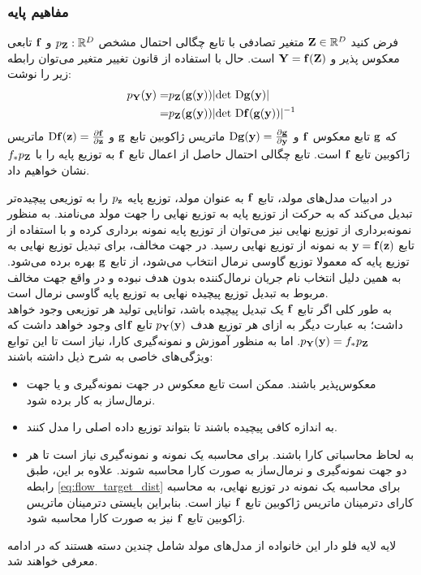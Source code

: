 \subsubsection{مفاهیم پایه}
فرض کنید
${\bf{ Z}} \in \mathbb{R}^{D}$
متغیر تصادفی با تابع چگالی احتمال مشخص
$p_{\bf Z}: \mathbb{R}^D$
و $\bf f$ تابعی معکوس پذیر و
${\bf Y} = {\bf f}({\bf Z})$
است. حال با استفاده از قانون تغییر متغیر می‌توان رابطه زیر را نوشت:
\begin{align}  \label{eq:flow_target_dist}
	p_{\bf Y}({\bf y}) = & p_{\bf Z}({\bf g}({\bf y}))
	|\text{det} ~ \text{D} {\bf g}({\bf y})|
	\nonumber                                          \\
	=                    & p_{\bf Z}({\bf g}({\bf y}))
	|\text{det} ~ \text{D} {\bf f}({\bf g}({\bf y}))|^{-1}
\end{align}
که $\bf g$ تابع معکوس $\bf f$ و
$\text{D} {\bf g}({\bf y}) = \frac{\partial {\bf g}}{\partial {\bf y}}$
ماتریس ژاکوبین تابع $\bf g$ و
$\text{D} {\bf f}({\bf z}) = \frac{\partial {\bf f}}{\partial {\bf z}}$
ماتریس ژاکوبین تابع $\bf f$ است. تابع چگالی احتمال حاصل از اعمال تابع $\bf f$ به توزیع پایه را با
$f_*p_{\bf Z}$
نشان خواهیم داد.

در ادبیات مدل‌های مولد، تابع $\bf f$ به عنوان مولد، توزیع پایه
$p_{\bf z}$
را به توزیعی پیچیده‌تر تبدیل می‌کند که به حرکت از توزیع پایه به توزیع نهایی را جهت مولد می‌نامند. به منظور نمونه‌برداری از توزیع نهایی نیز می‌توان از توزیع پایه نمونه برداری کرده و با استفاده از تابع
${\bf y} = {\bf f} ( {\bf z} )$
به نمونه از توزیع نهایی رسید. در جهت مخالف، برای تبدیل توزیع نهایی به توزیع پایه که معمولا توزیع گاوسی نرمال انتخاب می‌شود، از تابع $\bf g$ بهره برده می‌شود. به همین دلیل انتخاب نام جریان نرمال‌کننده بدون هدف نبوده و در واقع جهت مخالف مربوط به تبدیل توزیع پیچیده نهایی به توزیع پایه گاوسی نرمال است.
\\
به طور کلی اگر تابع $\bf f$ یک تبدیل پیچیده باشد، توانایی تولید هر توزیعی وجود خواهد داشت؛ به عبارت دیگر به ازای هر توزیع هدف
$ p_{\bf Y}({\bf y})$
تابع $\bf f$ای وجود خواهد داشت که
$ p_{\bf Y}({\bf y}) = f_*p_{\bf Z}$.
اما به منظور آموزش و نمونه‌گیری کارا، نیاز است تا این توابع ویژگی‌های خاصی به شرح ذیل داشته باشند:
\begin{itemize}
	\item
	      معکوس‌پذیر باشند. ممکن است تابع معکوس در جهت نمونه‌گیری و یا جهت نرمال‌ساز به کار برده شود.
	\item
	      به اندازه کافی پیچیده باشند تا بتواند توزیع داده اصلی را مدل کنند.
	\item
	      به لحاظ محاسباتی کارا باشند. برای محاسبه \likelihood{} یک نمونه و نمونه‌گیری نیاز است تا هر دو جهت نمونه‌گیری و نرمال‌ساز به صورت کارا محاسبه شوند. علاوه بر این، طبق رابطه \ref{eq:flow_target_dist} برای محاسبه  \likelihood{} یک نمونه در توزیع نهایی، به محاسبه کارای دترمینان ماتریس ژاکوبین تابع $\bf f$ نیاز است. بنابراین بایستی دترمینان ماتریس ژاکوبین تابع $\bf f$ نیز به صورت کارا محاسبه شود.
\end{itemize}
لایه لایه فلو دار
این خانواده از مدل‌های مولد شامل چندین دسته هستند که در ادامه معرفی خواهند شد.
